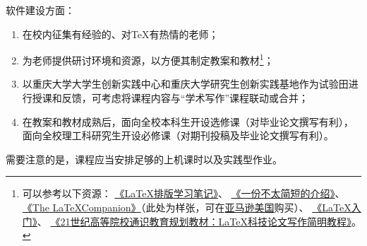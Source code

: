 软件建设方面：
\begin{enumerate}
	\item 在校内征集有经验的、对\TeX 有热情的老师；
	\item 为老师提供研讨环境和资源，以方便其制定教案和教材\footnote{可以参考以下资源：
		\href{http://bbs.ctex.org/forum.php?mod=viewthread&tid=68619}{《\LaTeX 排版学习笔记》}、
		\href{http://texdoc.net/texmf-dist/doc/latex/lshort-chinese/lshort-zh-cn.pdf}{《一份不太简短的\LaTeXe 介绍》}、
		\href{http://ptgmedia.pearsoncmg.com/images/9780201362992/samplepages/0201362996.pdf}{《The \LaTeX Companion》}（此处为样张，可在\href{https://www.amazon.com/dp/0201362996}{亚马逊美国}购买）、
		\href{https://www.amazon.cn/dp/B00D1APK0G}{《\LaTeX 入门》}、
		\href{https://www.amazon.cn/dp/B019ERSEAW/}{《21世纪高等院校通识教育规划教材：\LaTeX 科技论文写作简明教程》}。}；
	\item 以重庆大学大学生创新实践中心和重庆大学研究生创新实践基地作为试验田进行授课和反馈，可考虑将课程内容与“学术写作”课程联动或合并；
	\item 在教案和教材成熟后，面向全校本科生开设选修课（对毕业论文撰写有利），面向全校理工科研究生开设必修课（对期刊投稿及毕业论文撰写有利）。
\end{enumerate}

需要注意的是，课程应当安排足够的上机课时以及实践型作业。